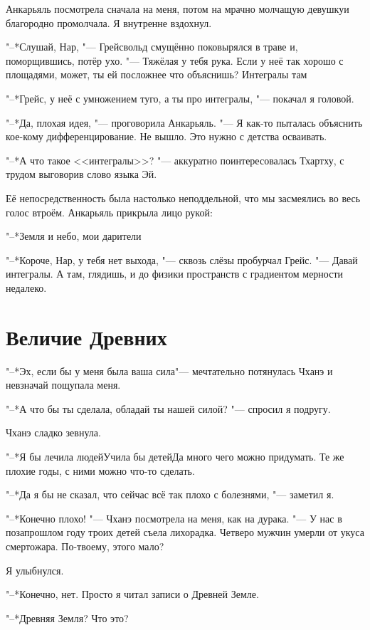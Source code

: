 Анкарьяль посмотрела сначала на меня, потом на мрачно молчащую девушку\ldotst и благородно промолчала.
Я внутренне вздохнул.

"--*Слушай, Нар, "--- Грейсвольд смущённо поковырялся в траве и, поморщившись, потёр ухо.
"--- Тяжёлая у тебя рука.
Если у неё так хорошо с площадями, может, ты ей посложнее что объяснишь?
Интегралы там\ldotst

"--*Грейс, у неё с умножением туго, а ты про интегралы, "--- покачал я головой.

"--*Да, плохая идея, "--- проговорила Анкарьяль.
"--- Я как-то пыталась объяснить кое-кому дифференцирование.
Не вышло.
Это нужно с детства осваивать.

"--*А что такое <<интегралы>>? "--- аккуратно поинтересовалась Тхартху, с трудом выговорив слово языка Эй.

Её непосредственность была настолько неподдельной, что мы засмеялись во весь голос втроём.
Анкарьяль прикрыла лицо рукой:

"--*Земля и небо, мои дарители\ldotst

"--*Короче, Нар, у тебя нет выхода, "--- сквозь слёзы пробурчал Грейс.
"--- Давай интегралы.
А там, глядишь, и до физики пространств с градиентом мерности недалеко.

\section {Величие Древних}

"--*Эх, если бы у меня была ваша сила\ldotst "--- мечтательно потянулась Чханэ и невзначай пощупала меня.

"--*А что бы ты сделала, обладай ты нашей силой? "--- спросил я подругу.

Чханэ сладко зевнула.

"--*Я бы лечила людей\ldotst Учила бы детей\ldotst Да много чего можно придумать.
Те же плохие годы, с ними можно что-то сделать.

"--*Да я бы не сказал, что сейчас всё так плохо с болезнями, "--- заметил я.

"--*Конечно плохо! "--- Чханэ посмотрела на меня, как на дурака.
"--- У нас в позапрошлом году троих детей съела лихорадка.
Четверо мужчин умерли от укуса смертожара.
По-твоему, этого мало?

Я улыбнулся.

"--*Конечно, нет.
Просто я читал записи о Древней Земле.

"--*Древняя Земля?
Что это?

